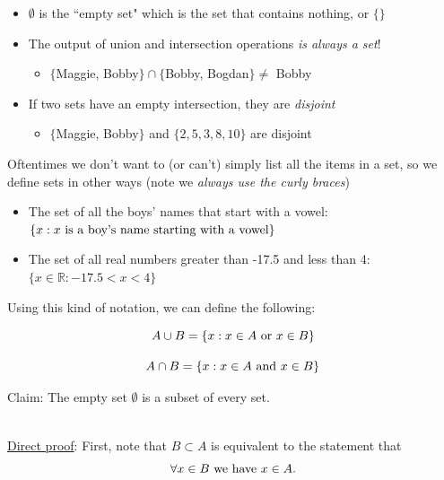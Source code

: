 \documentclass[10pt]{seminar}
\begin{document}
\begin{slide}
\begin{itemize}
\vspace{.05in}

\item $\emptyset$ is the ``empty set" which is the set that contains nothing, or $\{\}$ 
\vspace{.05in}
\item The output of union and intersection operations \textit{is always a set}!

\begin{itemize}
\item $\{$Maggie, Bobby$\} \cap \{$Bobby, Bogdan$\} \not=$ Bobby
\end{itemize}

\item If two sets have an empty intersection, they are \textit{disjoint}

\begin{itemize}
 \item $\{$Maggie, Bobby$\}$ and $  \{2, 5, 3, 8, 10\}$ are disjoint
\end{itemize}

 \end{itemize}
 
  \newslide
Oftentimes we don't want to (or can't) simply list all the items in a set, so we define sets in other ways (note  we \textit{always use the curly braces})

\vspace{.15in}
\begin{itemize}
\item The set of all the boys' names that start with a vowel: $\{x: x\hbox{ is a boy's name starting with a vowel}\}$

\item The set of all real numbers greater than -17.5 and less than 4: $\{x\in \mathbb{R}:-17.5<x<4\}$
\end{itemize}
 
 Using this kind of notation, we can define the following:
 
 $$A\cup B=\{x: x\in A \hbox{ or } x\in B\}$$
 
 $$A\cap B=\{x: x\in A \hbox{ and } x\in B\}$$
 

 
\newslide

Claim:  The empty set $\emptyset$ is a subset of every set.

\ \\\underline{Direct proof}: First, note that $B\subset A$ is equivalent to the statement that $$\forall x\in B \hbox{ we have }  x\in A.$$ 


\end{slide}
\end{document}
